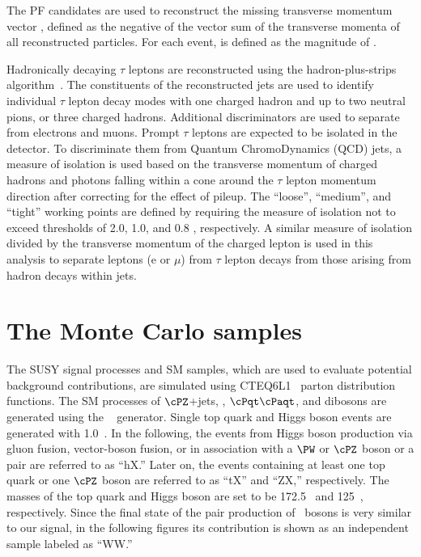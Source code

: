 The PF candidates are used to reconstruct the missing transverse momentum  vector \ptvecmiss, 
defined as the negative of the vector sum of the transverse momenta of all reconstructed particles.  
For each event, \MPT is defined as the magnitude of \ptvecmiss.

Hadronically decaying $\tau$ leptons are reconstructed using the hadron-plus-strips algorithm~\cite{Khachatryan:2015dfa}.
The constituents of the reconstructed jets are used to identify individual $\tau$ lepton decay modes with one charged 
hadron and up to two neutral pions, or three charged hadrons. 
Additional discriminators are used to separate \Tau from electrons and muons.
Prompt $\tau$ leptons are expected to be isolated in the detector.
To discriminate them from Quantum ChromoDynamics (QCD) jets, a measure of isolation \cite{Khachatryan:2014wca} is used 
based on the transverse momentum of charged hadrons and photons falling within 
a cone around the $\tau$ lepton momentum direction after correcting for the effect of
pileup. The ``loose'', ``medium'', and ``tight'' working points are defined
by requiring the measure of isolation not to exceed thresholds of 2.0, 1.0,
and 0.8 \GeV, respectively.
 A similar measure of isolation divided by the transverse momentum of the charged lepton is 
used in this analysis to separate leptons (e or $\mu$) from $\tau$ lepton decays from 
those arising from hadron decays within jets.

\section{The Monte Carlo samples}
\label{sect:MCSamples}
The SUSY signal processes and SM samples, which are used to evaluate potential background contributions, 
are simulated using CTEQ6L1~\cite{Nadolsky:2008zw} parton distribution functions. 
The SM processes of $\cPZ$+jets, \wjets, $\cPqt\cPaqt$, and dibosons are generated using the ~\cite{Alwall:2011uj} generator. 
Single top quark and Higgs boson events are generated with {\POWHEG} 1.0~\cite{Nason:2004rx,Frixione:2007vw,Alioli:2009je,Alioli:2010xd}.
In the following, the events from Higgs boson production via gluon fusion, vector-boson fusion, or in association with a $\PW$ or $\cPZ$  boson 
or a \ttbar pair are referred to as ``hX.'' Later on, 
the events containing at least one top quark or one $\cPZ$ boson are referred to as ``tX'' and ``ZX,'' respectively. 
The masses of the top quark and Higgs boson are set to be 172.5\GeV~\cite{Khachatryan:2015hba} and 125\GeV~\cite{Aad:2015zhl}, respectively. Since the 
final state of the pair production of \PW~bosons is very similar to our signal, in the following figures its contribution is shown as an independent sample 
labeled as ``WW.''

